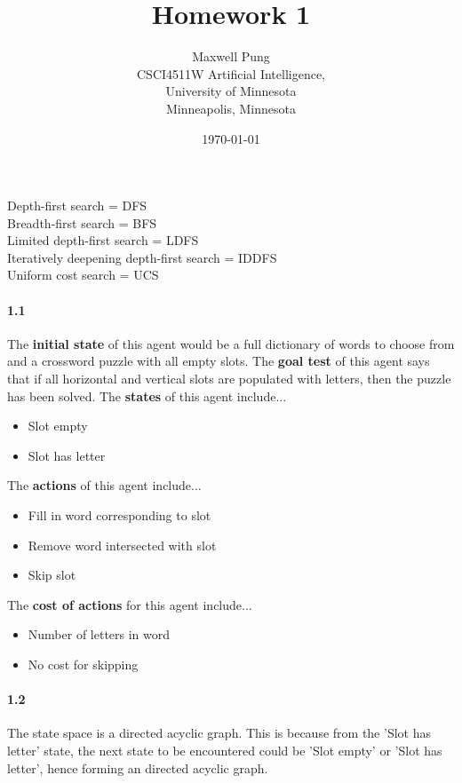 \documentclass[12pt]{article}
\begin{document}
\title{Homework 1}
\author{Maxwell Pung\\
	CSCI4511W Artificial Intelligence,\\
	University of Minnesota\\
	Minneapolis, Minnesota}
\date{\today}
\maketitle

\newpage

\noindent Depth-first search = DFS\\
Breadth-first search = BFS\\
Limited depth-first search = LDFS\\
Iteratively deepening depth-first search = IDDFS\\
Uniform cost search = UCS\\

\paragraph{1.1}
The \textbf{initial state} of this agent would be a full dictionary of words to choose from and a crossword puzzle with all empty slots. The \textbf{goal test} of this agent says that if all horizontal and vertical slots are populated with letters, then the puzzle has been solved. The \textbf{states} of this agent include...
\begin{itemize}
	\item Slot empty
	\item Slot has letter
\end{itemize}
The \textbf{actions} of this agent include...
\begin{itemize}
	\item Fill in word corresponding to slot
	\item Remove word intersected with slot
	\item Skip slot
\end{itemize}
The \textbf{cost of actions} for this agent include...
\begin{itemize}
	\item Number of letters in word
	\item No cost for skipping
\end{itemize}
\paragraph{1.2}
The state space is a directed acyclic graph. This is because from the 'Slot has letter' state, the next state to be encountered could be 'Slot empty' or 'Slot has letter', hence forming an directed acyclic graph.
\end{document}
